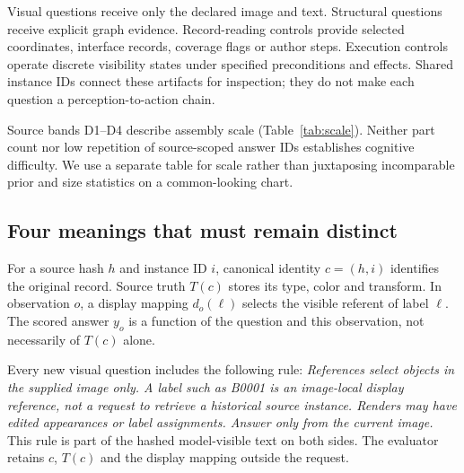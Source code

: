 \documentclass[10pt,twocolumn,letterpaper]{article}
\begin{document}
\begin{table}[t]
\centering\small
\caption{Historical family inventory. Stable schema key
\texttt{shape-match} always displays as Part-type. Roles are disjoint:
140 visual, 146 structural, 290 nonconstant and 41 constant controls.}
\label{tab:roles}

\end{table}

Visual questions receive only the declared image and text. Structural
questions receive explicit graph evidence. Record-reading controls
provide selected coordinates, interface records, coverage flags or
author steps. Execution controls operate discrete visibility states
under specified preconditions and effects. Shared instance IDs connect
these artifacts for inspection; they do not make each question a
perception-to-action chain.

Source bands D1--D4 describe assembly scale
(Table~\ref{tab:scale}). Neither part count nor low repetition of
source-scoped answer IDs establishes cognitive difficulty. We use
a separate table for scale rather than juxtaposing incomparable
prior and size statistics on a common-looking chart.

\begin{table}[t]
\centering\small
\caption{Source scale only. Parts count placed instances; items count
historical questions. These columns have different units and are
not difficulty estimates.}
\label{tab:scale}

\end{table}

\subsection{Four meanings that must remain distinct}
For a source hash $h$ and instance ID $i$, canonical identity
$c=(h,i)$ identifies the original record. Source truth $T(c)$ stores
its type, color and transform. In observation $o$, a display mapping
$d_o(\ell)$ selects the visible referent of label $\ell$. The scored
answer $y_o$ is a function of the question and this observation,
not necessarily of $T(c)$ alone.

Every new visual question includes the following rule:
\emph{References select objects in the supplied image only. A label
such as B0001 is an image-local display reference, not a request to
retrieve a historical source instance. Renders may have edited
appearances or label assignments. Answer only from the current image.}
This rule is part of the hashed model-visible text on both sides.
The evaluator retains $c$, $T(c)$ and the display mapping outside
the request.
\end{document}
